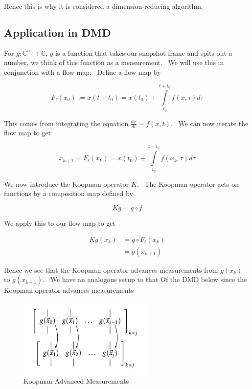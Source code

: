 \documentclass[12pt]{report}
\begin{document}
Hence this is why it is considered a dimension-reducing algorithm.   

\subsection{Application in DMD} 

For $g:%
\mathbb{C}
^{n}\longrightarrow 
\mathbb{C}
$, $g$ is a function that takes our snapshot frame and spits out a number,
we think of this function as a measurement. \ We will use this in
conjunction with a flow map. \ Define a flow map by

\begin{equation}
    F_{t}(x_{0}):=x(t+t_{0})=x(t_{0})+\int\limits_{t_{0}}^{t+t_{0}}f(x,\tau
    )d\tau
\end{equation}

This comes from integrating the equation $\frac{dx}{dt}=f(x,t)$. \ We can
now iterate the flow map to get

\begin{equation}
    x_{k+1}=F_{t}(x_{k})=x(t_{0})+\int\limits_{t_{0}}^{t+t_{0}}f(x_{k},\tau
    )d\tau
\end{equation}

We now introduce the Koopman operator $K.$ \ The Koopman operator acts on
functions by a composition map defined by

\begin{equation}
    Kg=g\circ f
\end{equation}

We apply this to our flow map to get 

\begin{equation}
    \begin{aligned}
        Kg(x_{k}) &=g\circ F_{t}(x_{k}) \\
        &=g(x_{k+1})
    \end{aligned}
\end{equation}

Hence we see that the Koopman operator advances measurements from $%
g(x_{k})$ to $g(x_{k+1})$. \ We have an analogous setup to that Of the DMD
below since the Koopman operator advances measurements
\begin{figure}
    \centering
    \includegraphics[width=0.6\textwidth]{g(X) to g(X').png}
    \caption{Koopman Advanced Measurements}
    \label{kooppic}
\end{figure}
\end{document}

